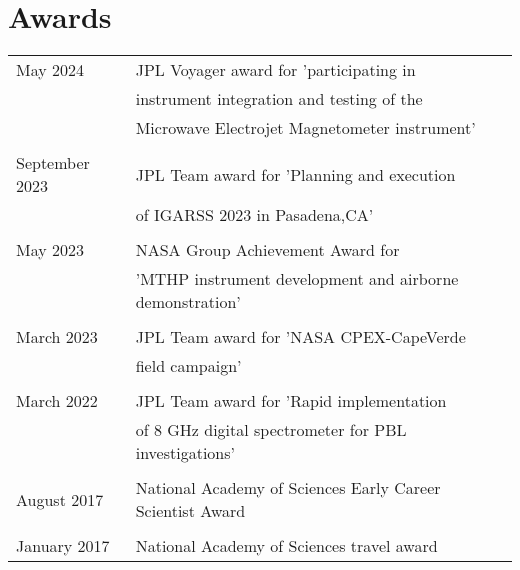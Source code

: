 \documentclass[letterpaper,12pt,oneside]{article}
\begin{document}
\section*{Awards}
\vspace*{-0.8\baselineskip}	
\begin{spacing}{.9}	
\begin{large}	
\noindent \begin{longtable}{@{} p{5cm} l}
May 2024        & JPL Voyager award for 'participating in \\
                & instrument integration and testing of the\\ & Microwave Electrojet Magnetometer instrument'\\
                &\\
September 2023  & JPL Team award for 'Planning and execution\\                 & of IGARSS 2023 in Pasadena,CA'\\
                &\\
May 2023        & NASA Group Achievement Award for\\
                &'MTHP instrument development and airborne demonstration'\\
                &\\
March 2023      & JPL Team award for 'NASA CPEX-CapeVerde\\                    &field campaign'\\
                &\\
March 2022      & JPL Team award for 'Rapid implementation\\
                & of 8 GHz digital spectrometer for PBL investigations'\\
                &\\
August 2017 	& National Academy of Sciences Early Career    Scientist Award\\
                &\\
January 2017	& National Academy of Sciences travel award\\
\end{longtable}
\end{large}

\end{spacing}
\end{document}
